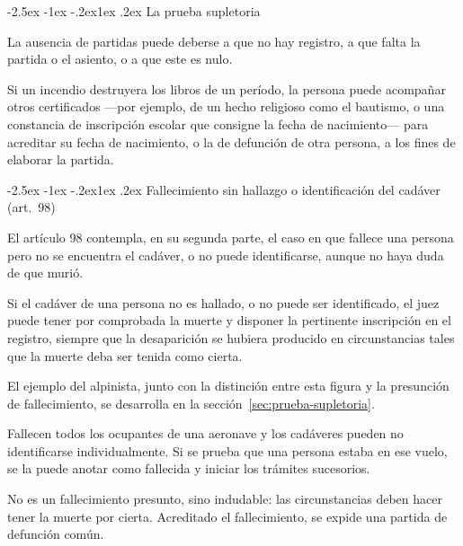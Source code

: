 \documentclass[12pt,oneside]{book}
\makeatletter
\renewcommand\subsection{\@startsection{subsection}{2}{\z@}%
  {-2.5ex \@plus -1ex \@minus -.2ex}{1ex \@plus .2ex}%
  {\normalfont\normalsize\bfseries}}
\makeatother
\begin{document}
\subsection{La prueba supletoria}

La ausencia de partidas puede deberse a que no hay registro, a que falta la partida o el asiento, o a que este es nulo.

\begin{ejemplo}
Si un incendio destruyera los libros de un período, la persona puede acompañar otros certificados ---por ejemplo, de un hecho religioso como el bautismo, o una constancia de inscripción escolar que consigne la fecha de nacimiento--- para acreditar su fecha de nacimiento, o la de defunción de otra persona, a los fines de elaborar la partida.
\end{ejemplo}

\subsection{Fallecimiento sin hallazgo o identificación del cadáver (art.~98)}

El artículo 98 contempla, en su segunda parte, el caso en que fallece una persona pero no se encuentra el cadáver, o no puede identificarse, aunque no haya duda de que murió.

\begin{regla}
Si el cadáver de una persona no es hallado, o no puede ser identificado, el juez puede tener por comprobada la muerte y disponer la pertinente inscripción en el registro, siempre que la desaparición se hubiera producido en circunstancias tales que la muerte deba ser tenida como cierta.
\end{regla}

El ejemplo del alpinista, junto con la distinción entre esta figura y la presunción de fallecimiento, se desarrolla en la sección~\ref{sec:prueba-supletoria}.

\begin{ejemplo}
Fallecen todos los ocupantes de una aeronave y los cadáveres pueden no identificarse individualmente. Si se prueba que una persona estaba en ese vuelo, se la puede anotar como fallecida y iniciar los trámites sucesorios.
\end{ejemplo}

No es un fallecimiento presunto, sino indudable: las circunstancias deben hacer tener la muerte por cierta. Acreditado el fallecimiento, se expide una partida de defunción común.
\end{document}
